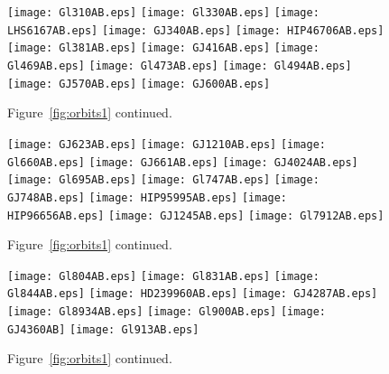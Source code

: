 \documentclass[twocolumn]{aastex62}
\begin{document}
\begin{figure}[htp]
\begin{center}
\texttt{[image: Gl310AB.eps]}
\texttt{[image: Gl330AB.eps]}
\texttt{[image: LHS6167AB.eps]}
\texttt{[image: GJ340AB.eps]}
\texttt{[image: HIP46706AB.eps]}%
\texttt{[image: Gl381AB.eps]}
\texttt{[image: GJ416AB.eps]}
\texttt{[image: Gl469AB.eps]}
\texttt{[image: Gl473AB.eps]}
\texttt{[image: Gl494AB.eps]}
\texttt{[image: GJ570AB.eps]}
\texttt{[image: GJ600AB.eps]}
\caption{Figure~\ref{fig:orbits1} continued.}
\label{fig:orbits3}
\end{center}
\end{figure}

\begin{figure}[htp]
\begin{center}
\texttt{[image: GJ623AB.eps]}
\texttt{[image: GJ1210AB.eps]}
\texttt{[image: Gl660AB.eps]}
\texttt{[image: GJ661AB.eps]}
\texttt{[image: GJ4024AB.eps]}
\texttt{[image: Gl695AB.eps]}
\texttt{[image: Gl747AB.eps]}
\texttt{[image: GJ748AB.eps]}
\texttt{[image: HIP95995AB.eps]}
\texttt{[image: HIP96656AB.eps]}
\texttt{[image: GJ1245AB.eps]}
\texttt{[image: Gl7912AB.eps]}
\caption{Figure~\ref{fig:orbits1} continued.}
\label{fig:orbits4}
\end{center}
\end{figure}


\begin{figure}[htp]
\begin{center}
\texttt{[image: Gl804AB.eps]}
\texttt{[image: Gl831AB.eps]}
\texttt{[image: Gl844AB.eps]}
\texttt{[image: HD239960AB.eps]} 
\texttt{[image: GJ4287AB.eps]}
\texttt{[image: Gl8934AB.eps]}
\texttt{[image: Gl900AB.eps]}
\texttt{[image: GJ4360AB]}
\texttt{[image: Gl913AB.eps]}
\caption{Figure~\ref{fig:orbits1} continued.}
\label{fig:orbits5}
\end{center}
\end{figure}

\clearpage








\end{document}
